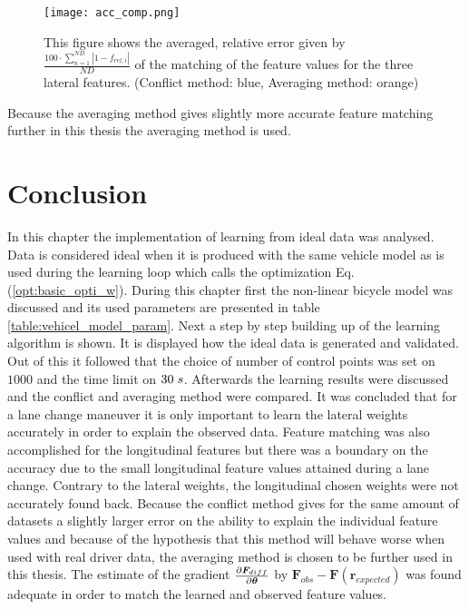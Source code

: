 \begin{figure}[h!]
	\centering
	\texttt{[image: acc\_comp.png]}
	\caption{This figure shows the averaged, relative error given by $\frac{100\cdot\sum_{n=1}^{ND}|1-f_{rel,i}|}{ND}$ of the matching of the feature values for the three lateral features. (Conflict method: blue, Averaging method: orange)}
	\label{fig:acc_comp}
\end{figure}

Because the averaging method gives slightly more accurate feature matching further in this thesis the averaging method is used.

 
 \section{Conclusion} \label{s:conclusion_cha4}
In this chapter the implementation of learning from ideal data was analysed. Data is considered ideal when it is produced with the same vehicle model as is used during the learning loop which calls the optimization Eq. (\ref{opt:basic_opti_w}). During this chapter first the non-linear bicycle model was discussed and its used parameters are presented in table \ref{table:vehicel_model_param}. Next a step by step building up of the learning algorithm is shown. It is displayed how the ideal data is generated and validated. Out of this it followed that the choice of number of control points was set on $1000$ and the time limit on $30 \hspace{1mm}s$. Afterwards the learning results were discussed and the conflict and averaging method were compared. It was concluded that for a lane change maneuver it is only important to learn the lateral weights accurately in order to explain the observed data. Feature matching was also accomplished for the longitudinal features but there was a boundary on the accuracy due to the small longitudinal feature values attained during a lane change. Contrary to the lateral weights, the longitudinal chosen weights were not accurately found back. Because the conflict method gives for the same amount of datasets a slightly larger error on the ability to explain the individual feature values and because of the hypothesis that this method will behave worse when used with real driver data, the averaging method is chosen to be further used in this thesis. The estimate of the gradient $\pdv{\bm{F}_{diff}}{\bm{\theta}}$ by $\bm{F}_{obs} - \bm{F}(\bm{r}_{expected})$ was found adequate in order to match the learned and observed feature values.



